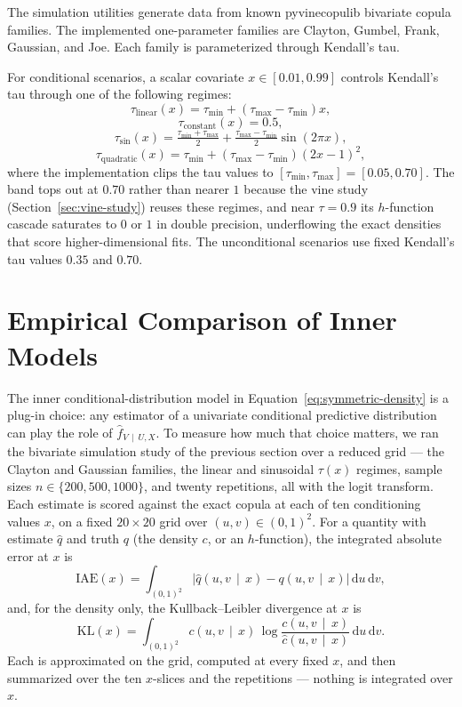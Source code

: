 \documentclass[11pt]{article}
\newcommand{\dd}{\,\mathrm{d}}
\newcommand{\given}{\,\mid\,}
\begin{document}
The simulation utilities generate data from known pyvinecopulib
bivariate copula families. The implemented one-parameter families are
Clayton, Gumbel, Frank, Gaussian, and Joe. Each family is parameterized
through Kendall's tau.

For conditional scenarios, a scalar covariate $x \in [0.01,0.99]$
controls Kendall's tau through one of the following regimes:
\[
  \tau_{\mathrm{linear}}(x)
  =
  \tau_{\min}+(\tau_{\max}-\tau_{\min})x,
\]
\[
  \tau_{\mathrm{constant}}(x)=0.5,
\]
\[
  \tau_{\mathrm{sin}}(x)
  =
  \tfrac{\tau_{\min}+\tau_{\max}}{2}
  +
  \tfrac{\tau_{\max}-\tau_{\min}}{2}\sin(2\pi x),
\]
\[
  \tau_{\mathrm{quadratic}}(x)
  =
  \tau_{\min}+(\tau_{\max}-\tau_{\min})(2x-1)^2,
\]
where the implementation clips the tau values to
$[\tau_{\min},\tau_{\max}]=[0.05,0.70]$. The band tops out at $0.70$ rather
than nearer $1$ because the vine study (Section~\ref{sec:vine-study})
reuses these regimes, and near $\tau = 0.9$ its $h$-function cascade
saturates to $0$ or $1$ in double precision, underflowing the exact
densities that score higher-dimensional fits. The unconditional scenarios
use fixed Kendall's tau values $0.35$ and $0.70$.

\section{Empirical Comparison of Inner Models}

The inner conditional-distribution model in
Equation~\eqref{eq:symmetric-density} is a plug-in choice: any estimator
of a univariate conditional predictive distribution can play the role of
$\widehat f_{V \given U,X}$. To measure how much that choice matters, we
ran the bivariate simulation study of the previous section over a reduced
grid --- the Clayton and Gaussian families, the linear and sinusoidal
$\tau(x)$ regimes, sample sizes $n \in \{200,500,1000\}$, and twenty
repetitions, all with the logit transform. Each estimate is scored against
the exact copula at each of ten conditioning values $x$, on a fixed
$20 \times 20$ grid over $(u,v) \in (0,1)^2$. For a quantity with estimate
$\widehat q$ and truth $q$ (the density $c$, or an $h$-function), the
integrated absolute error at $x$ is
\[
  \mathrm{IAE}(x)
  =
  \int_{(0,1)^2}
    \bigl|\widehat q(u,v \given x) - q(u,v \given x)\bigr|
  \dd u \dd v,
\]
and, for the density only, the Kullback--Leibler divergence at $x$ is
\[
  \mathrm{KL}(x)
  =
  \int_{(0,1)^2}
    c(u,v \given x)\,\log\frac{c(u,v \given x)}{\widehat c(u,v \given x)}
  \dd u \dd v.
\]
Each is approximated on the grid, computed at every fixed $x$, and then
summarized over the ten $x$-slices and the repetitions --- nothing is
integrated over $x$.
\end{document}
